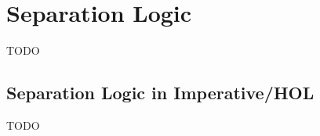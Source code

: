 \chapter{Separation Logic}\label{chapter:separation-logic}

TODO

\section{Separation Logic in Imperative/HOL}\label{section:separation-logic-hol}

TODO
